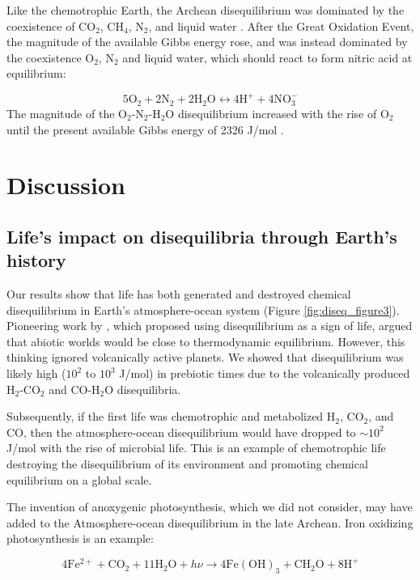 Like the chemotrophic Earth, the Archean disequilibrium was dominated by the coexistence of CO$_2$, CH$_4$, N$_2$, and liquid water \citep{KrissansenTotton_2018_diseq}. After the Great Oxidation Event, the magnitude of the available Gibbs energy rose, and was instead dominated by the coexistence O$_2$, N$_2$ and liquid water, which should react to form nitric acid at equilibrium:

\begin{equation}
  \label{eq:o2n2h2o_diseq_react}
  5 \mathrm{O_2} + 2 \mathrm{N_2} + 2 \mathrm{H_2O} \leftrightarrow 4 \mathrm{H^{+}} + 4 \mathrm{NO_3^{-}}
\end{equation}
The magnitude of the O$_2$-N$_2$-H$_2$O disequilibrium increased with the rise of O$_2$ until the present available Gibbs energy of 2326 J/mol \citep{KrissansenTotton_2016}. 

\section{Discussion}

\subsection{Life's impact on disequilibria through Earth's history}

Our results show that life has both generated and destroyed chemical disequilibrium in Earth's atmosphere-ocean system (Figure \ref{fig:diseq_figure3}). Pioneering work by \citet{Lovelock_1975}, which proposed using disequilibrium as a sign of life, argued that abiotic worlds would be close to thermodynamic equilibrium. However, this thinking ignored volcanically active planets. We showed that disequilibrium was likely high ($10^2$ to $10^3$ J/mol) in prebiotic times due to the volcanically produced H$_2$-CO$_2$ and CO-H$_2$O disequilibria.

Subsequently, if the first life was chemotrophic and metabolized H$_2$, CO$_2$, and CO, then the atmosphere-ocean disequilibrium would have dropped to $\sim 10^2$ J/mol with the rise of microbial life. This is an example of chemotrophic life destroying the disequilibrium of its environment and promoting chemical equilibrium on a global scale.

The invention of anoxygenic photosynthesis, which we did not consider, may have added to the Atmosphere-ocean disequilibrium in the late Archean. Iron oxidizing photosynthesis is an example: 

\begin{equation}
  4 \mathrm{Fe^{2+}} + \mathrm{CO_2} + 11 \mathrm{H_2O} + h\nu \rightarrow 4 \mathrm{Fe(OH)_3} + \mathrm{CH_2O} + 8 \mathrm{H^{+}}
\end{equation}

